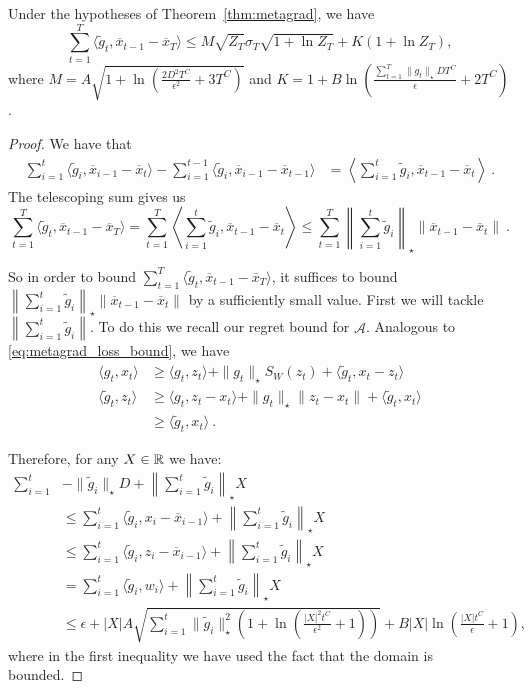 \documentclass[12pt]{colt2018} %
\newcommand{\ol}{\mathcal{A}}
\begin{document}
\begin{lemma}
\label{lemma:shortcut}
Under the hypotheses of Theorem~\ref{thm:metagrad}, we have 
\[
\sum_{t=1}^T \langle \tilde{g}_t, \overline{x}_{t-1} - \overline{x}_T\rangle
\leq  M \sqrt{Z_T} \sigma_T \sqrt{1+\ln Z_T}+K(1+\ln Z_T),
\]
where $M = A\sqrt{1+\ln\left(\frac{2D^2T^C}{\epsilon^2}+3T^C\right)}$ and $K=1+B\ln \left(\frac{\sum_{t=1}^T \|g_t\|_\star DT^C }{\epsilon}+2T^C\right)$.
\end{lemma}
%
\begin{proof}
We have that
\begin{align*}
\sum_{i=1}^t \langle \tilde{g}_i, \overline{x}_{i-1}-\overline{x}_t\rangle - \sum_{i=1}^{t-1} \langle \tilde{g}_i, \overline{x}_{i-1}-\overline{x}_{t-1}\rangle
&= \left\langle \sum_{i=1}^t \tilde{g}_{i},\overline{x}_{t-1}-\overline{x}_t\right\rangle~.
\end{align*}
The telescoping sum gives us
\[
\sum_{t=1}^T \langle \tilde{g}_t, \overline{x}_{t-1}-\overline{x}_T\rangle 
=\sum_{t=1}^{T} \left\langle \sum_{i=1}^t \tilde{g}_i,\overline{x}_{t-1}-\overline{x}_t\right\rangle
\leq \sum_{t=1}^{T} \left\| \sum_{i=1}^t \tilde{g}_i\right\|_\star  \|\overline{x}_{t-1}-\overline{x}_t\|~.
\]

So in order to bound $\sum_{t=1}^T \langle \tilde{g}_t,\overline{x}_{t-1}-\overline{x}_T\rangle$, it suffices to bound $\left\| \sum_{i=1}^t \tilde{g}_i\right\|_\star  \|\overline{x}_{t-1}-\overline{x}_t\|$ by a sufficiently small value.
First we will tackle $\left\|\sum_{i=1}^t \tilde{g}_i\right\|$. To do this we recall our regret bound for $\ol$. Analogous to \eqref{eq:metagrad_loss_bound}, we have
\begin{align*}
\langle g_t,x_t\rangle &\ge \langle g_t,z_t\rangle + \|g_t\|_\star S_W(z_t) + \langle \tilde{g}_t,x_t-z_t\rangle \\
\langle \tilde{g}_t, z_t\rangle&\ge \langle g_t,z_t-x_t\rangle  + \|g_t\|_\star  \|z_t-x_t\| + \langle \tilde{g}_t,x_t\rangle\\
&\ge \langle \tilde{g}_t,x_t\rangle~.
\end{align*}

Therefore, for any $X \in \mathbb{R}$ we have:
\begin{align*}
\sum_{i=1}^t &-\|\tilde{g}_i\|_\star D+\left\|\sum_{i=1}^t\tilde g_i\right\|_\star X \\
&\le \sum_{i=1}^t \langle \tilde{g}_i,x_i-\overline{x}_{i-1}\rangle +\left\|\sum_{i=1}^t\tilde g_i\right\|_\star X\\
&\le \sum_{i=1}^t \langle \tilde{g}_i,z_i-\overline{x}_{i-1}\rangle +\left\|\sum_{i=1}^t\tilde g_i\right\|_\star X\\
&= \sum_{i=1}^t \langle \tilde{g}_i,w_i\rangle+\left\|\sum_{i=1}^t\tilde g_i\right\|_\star X\\
&\le \epsilon + |X|A\sqrt{\sum_{i=1}^t \|\tilde{g}_i\|_\star^2\left(1+\ln\left(\frac{|X|^2t^C}{\epsilon^2}+1\right)\right)} + B|X|\ln\left(\frac{|X|t^C}{\epsilon}+1\right),
\end{align*}
where in the first inequality we have used the fact that the domain is bounded.


\end{proof}
\end{document}
